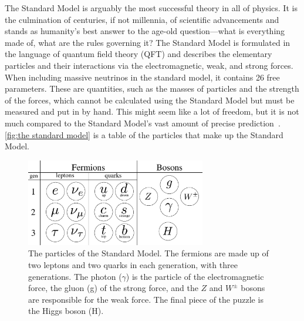 The Standard Model is arguably the most successful theory in all of physics.
It is the culmination of centuries, if not millennia, of scientific advancements and stands as humanity's best answer to the age-old question---what is everything made of, what are the rules governing it?
The Standard Model is formulated in the language of quantum field theory (QFT) and describes the elementary particles and their interactions via the electromagnetic, weak, and strong forces.
When including massive neutrinos in the standard model, it contains 26 free parameters.
These are quantities, such as the masses of particles and the strength of the forces, which cannot be calculated using the Standard Model but must be measured and put in by hand.
This might seem like a lot of freedom, but it is not much compared to the Standard Model's vast amount of precise prediction~\cite{Schwartz:QFT,griffiths:introduction,kramer:the_standard_model}.
\autoref{fig:the standard model} is a table of the particles that make up the Standard Model.

\begin{figure}[h]
    \centering
    \includegraphics[width=0.7\textwidth]{figurer/standard_model2.pdf}
    \caption{The particles of the Standard Model. The fermions are made up of two leptons and two quarks in each generation, with three generations. The photon ($\gamma$) is the particle of the electromagnetic force, the gluon (g) of the strong force, and the $Z$ and $W^\pm$ bosons are responsible for the weak force. The final piece of the puzzle is the Higgs boson (H).}
    \label{fig:the standard model}
\end{figure}

